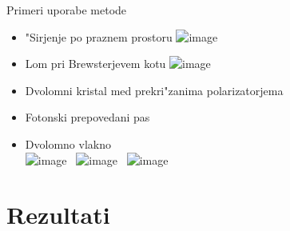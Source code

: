 \documentclass{beamer}
\begin{document}
\begin{frame}{Primeri uporabe metode}

\begin{itemize}[<+->]
 \item "Sirjenje po praznem prostoru
 \includegraphics<1>[width=.8\textwidth]{./Slike/empty}
 
 \item Lom pri Brewsterjevem kotu
 \includegraphics<2>[width=.8\textwidth]{./Slike/refraction}
 
 
  \item Dvolomni kristal med prekri"zanima polarizatorjema\\

 \item Fotonski prepovedani pas \\
  
 \item Dvolomno vlakno \\[1em]
  \includegraphics<5>[width=.25\textwidth]{./Defekti/g_defect_light_0} \,
  \includegraphics<5>[angle=180,origin=c,width=.25\textwidth]{./Slike/licp_0_68} \,
  \includegraphics<5>[width=.25\textwidth]{./Slike/licp_0_78}
  
\end{itemize}

\end{frame}

\section{Rezultati}
\end{document}
